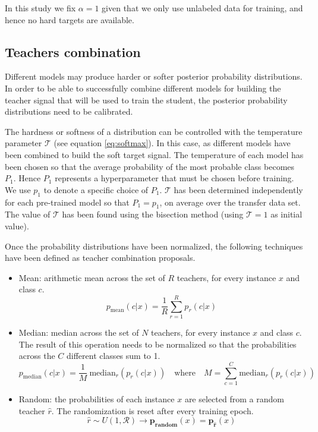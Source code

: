 In this study we fix $\alpha=1$ given that we only use unlabeled data for training, and hence no hard targets are available.

\subsection{Teachers combination} \label{sec:distillation_teachers_comb}
Different models may produce harder or softer posterior probability distributions. In order to be able to successfully combine  different models for building the teacher signal that will be used to train the student, the posterior probability distributions need to be calibrated.

The hardness or softness of a distribution can be controlled with the temperature parameter $\mathcal{T}$ (see equation \ref{eq:softmax}). In this case, as different models have been combined to build the soft target signal. The temperature of each model has been chosen so that the average probability of the most probable class becomes $P_1$. Hence $P_1$ represents a hyperparameter that must be chosen before training. We use $p_1$ to denote a specific choice of $P_1$.  $\mathcal{T}$ has been determined independently for each pre-trained model so that $P_1=p_1$, on average over the transfer data set. The value of $\mathcal{T}$ has been found using the bisection method (using $\mathcal{T}=1$ as initial value).

Once the probability distributions have been normalized, the following techniques have been defined as teacher combination proposals.

\begin{itemize}
 	\item Mean: arithmetic mean across the set of $R$ teachers, for every instance $x$ and class $c$.
 	$$p_{\text{mean}}(c|x) = \frac{1}{R} \sum_{r=1}^R p_{r}(c|x)$$
 	\item Median: median across the set of $N$ teachers, for every instance $x$ and class $c$. The result of this operation needs to be normalized so that the probabilities across the $C$ different classes sum to 1. $$p_{\text{median}}(c|x) = \frac{1}{M} \ \text{median}_r( p_{r}(c|x)) \quad \text{where} \quad M = \sum_{c=1}^C  \text{median}_r( p_{r}(c|x))$$
 	\item Random: the probabilities of each instance $x$ are selected from a random teacher $\hat{r}$. The randomization is reset after every training epoch.
 	$$\hat{r} \sim U(1, \mathcal{R}) \rightarrow \mathbf{p_\text{random}}(x) = \mathbf{p_{\hat{r}}}(x)$$
	\end{itemize}

